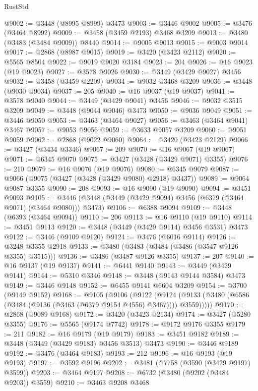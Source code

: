 \begin{lexlean}{RustStd}
\begin{coremodule}
{{{{{{{{{{{{{{{{{{{@9002 := @3448 (@8995 @8999) @3473
@9003 := @3446 @9002
@9005 := @3476 (@3464 @8992)
@9009 := @3458 (@3459 @2193) @3468 @3209
@9013 := @3480 (@3483 (@3484 @9009)) @8440
@9014 := @9005 @9013
@9015 := @9003 @9014
@9017 := @2868 (@8987 @9015)
@9019 := @3420 (@3423 @2112)
@9020 := @5565 @8504
@9022 := @9019 @9020 @3184
@9023 := 204
@9026 := @16 @9023 (@19 @9023)
@9027 := @3578 @9026
@9030 := @3449 (@3429 @9027) @3456
@9032 := @3458 (@3459 @2209)
@9034 := @9032 @3468 @3209
@9036 := @3448 (@9030 @9034)
@9037 := 205
@9040 := @16 @9037 (@19 @9037)
@9041 := @3578 @9040
@9044 := @3449 (@3429 @9041) @3456
@9046 := @9032 @3515 @3209
@9049 := @3448 (@9044 @9046) @3473
@9050 := @9036 @9049
@9051 := @3446 @9050
@9053 := @3463 (@3464 @9027)
@9056 := @3463 (@3464 @9041) @3467
@9057 := @9053 @9056
@9059 := @3633 @9057 @3209
@9060 := @9051 @9059
@9062 := @2868 (@9022 @9060)
@9064 := @3420 (@3423 @2129)
@9066 := @3427 (@3434 @3346)
@9067 := 209
@9070 := @16 @9067 (@19 @9067)
@9071 := @6345 @9070
@9075 := @3427 (@3428 (@3429 @9071) @3355)
@9076 := 210
@9079 := @16 @9076 (@19 @9076)
@9080 := @6345 @9079
@9087 := @9066 (@9075 (@3427 (@3428 (@3429 @9080) @2918) @3437))
@9089 := @9064 @9087 @3355
@9090 := 208
@9093 := @16 @9090 (@19 @9090)
@9094 := @3451 @9093
@9105 := @3446 (@3448 (@3449 (@3429 @9094) @3456 (@6379 (@3464 @9071) (@3464 @9080))) @3473)
@9106 := @6388 @9094
@9109 := @3448 (@6393 (@3464 @9094))
@9110 := 206
@9113 := @16 @9110 (@19 @9110)
@9114 := @3451 @9113
@9120 := @3448 (@3449 (@3429 @9114) @3456 @3531) @3473
@9122 := @3446 (@9109 @9120)
@9124 := @3476 (@6016 @9114)
@9126 := @3248 @3355 @2918
@9133 := @3480 (@3483 (@3484 (@3486 (@3547 @9126 @3355) @3515)))
@9136 := @3486 (@3487 @9126 @3355)
@9137 := 207
@9140 := @16 @9137 (@19 @9137)
@9141 := @6441 @9140
@9143 := @3449 (@3429 @9141)
@9144 := @5310 @3346
@9148 := @3448 (@9143 @9144 @3584) @3473
@9149 := @3446 @9148
@9152 := @6455 @9141 @6604 @3209
@9154 := @3700 (@9149 @9152)
@9168 := @9105
    (@9106
      (@9122
        (@9124 (@9133 (@3480 (@6586 (@3484 (@9136 (@3463 (@6379 @9154 @4556) @3467)))) @3559)))))
@9170 := @2868 (@9089 @9168)
@9172 := @3420 (@3423 @2134)
@9174 := @3427 (@5280 @3355)
@9176 := @5565 (@9174 @7742)
@9178 := @9172 @9176 @3355
@9179 := 211
@9182 := @16 @9179 (@19 @9179)
@9183 := @3451 @9182
@9189 := @3448 (@3449 (@3429 @9183) @3456 @3513) @3473
@9190 := @3446 @9189
@9192 := @3476 (@3464 @9183)
@9193 := 212
@9196 := @16 @9193 (@19 @9193)
@9197 := @3592 @9196
@9202 := @3481 (@7758 (@3590 (@3429 @9197) @3599))
@9203 := @3464 @9197
@9208 := @6732 (@3480 (@9202 (@3484 @9203)) @3559)
@9210 := @3463 @9208 @3468
}}}}}}}}}}}}}}}}}}}
\end{coremodule}
\end{lexlean}
